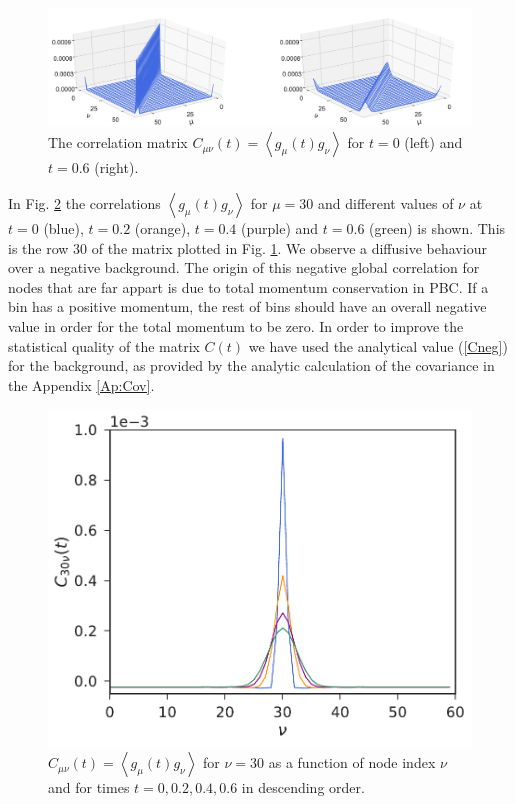 \documentclass[b5paper,openright,10pt]{book}
\newcommand{\llangle}{\left\langle}
\newcommand{\rrangle}{\right\rangle}
\begin{document}
\begin{figure}[h!]
\centering
\includegraphics[width=\linewidth]{Ct-matrix-PBC}
\caption[Correlation matrix $C(t)$ at $t=0$ and $t=0.6$ for an unconfined fluid]{The   correlation    matrix   $C_{\mu\nu}(t)=\llangle
g_{\mu}(t)  g_\nu\rrangle$ for  $t=0$ (left) and $t=0.6$ (right).}
\label{fig:Ct-matrix-PBC}
\end{figure}

In  Fig.    \ref{fig:Ct-mu30nu-PBC}  the   correlations  $\llangle
g_{\mu}(t)  g_\nu\rrangle$ for  $\mu=30$ and  different values  of
$\nu$ at $t=0$ (blue), $t=0.2$ (orange), $t=0.4$ (purple) and $t= 0.6$ (green) is shown.  This is the row 30 of the matrix plotted
in Fig. \ref{fig:Ct-matrix-PBC}.  We  observe a diffusive
behaviour over  a negative  background.  The  origin of  this negative
global  correlation for  nodes that  are far  appart is  due to  total
momentum conservation in PBC.  If a bin has  a positive momentum, the rest of
bins should  have an  overall negative  value in  order for  the total
momentum to  be zero. In order  to improve the statistical  quality of
the matrix  $C(t)$ we have  used the analytical value  (\ref{Cneg}) for
the  background,  as  provided  by the  analytic  calculation  of  the
covariance in the Appendix \ref{Ap:Cov}.

\begin{figure}[h!]
\centering
\includegraphics[scale=0.41]{Ct-mu30nu-PBC}
\caption[$C_{30\nu}(t)$ for an uncofined fluid]{$C_{\mu\nu}(t)=\llangle  g_{\mu}(t) g_\nu\rrangle$  for $\nu=30$
 as a  function of node index  $\nu$ and for times $t=0, 0.2, 0.4, 0.6$ in descending order.}
 \label{fig:Ct-mu30nu-PBC} 
\end{figure}
\end{document}
